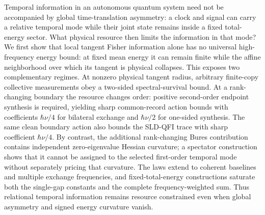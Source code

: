 Temporal information in an autonomous quantum system need not be accompanied by global time-translation asymmetry: a clock and signal can carry a relative temporal mode while their joint state remains inside a fixed total-energy sector. What physical resource then limits the information in that mode? We first show that local tangent Fisher information alone has no universal high-frequency energy bound: at fixed mean energy it can remain finite while the affine neighborhood over which its tangent is physical collapses. This exposes two complementary regimes. At nonzero physical tangent radius, arbitrary finite-copy collective measurements obey a two-sided spectral-survival bound. At a rank-changing boundary the resource changes order: positive second-order endpoint synthesis is required, yielding sharp common-record action bounds with coefficients $\hbar\nu/4$ for bilateral exchange and $\hbar\nu/2$ for one-sided synthesis. The same clean boundary action also bounds the SLD-QFI trace with sharp coefficient $\hbar\nu/4$. By contrast, the additional rank-changing Bures contribution contains independent zero-eigenvalue Hessian curvature; a spectator construction shows that it cannot be assigned to the selected first-order temporal mode without separately pricing that curvature. The laws extend to coherent baselines and multiple exchange frequencies, and fixed-total-energy constructions saturate both the single-gap constants and the complete frequency-weighted sum. Thus relational temporal information remains resource constrained even when global asymmetry and signed energy curvature vanish.